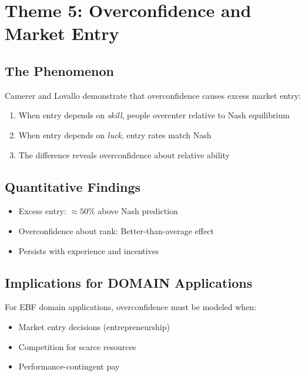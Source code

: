 \section{Theme 5: Overconfidence and Market Entry}
\label{sec:ca-overconfidence}

\subsection{The Phenomenon}

Camerer and Lovallo \citep{camerer1999overconfidence} demonstrate that overconfidence causes excess market entry:

\begin{enumerate}[nosep]
\item When entry depends on \textit{skill}, people overenter relative to Nash equilibrium
\item When entry depends on \textit{luck}, entry rates match Nash
\item The difference reveals overconfidence about relative ability
\end{enumerate}

\subsection{Quantitative Findings}

\begin{itemize}[nosep]
\item Excess entry: $\approx 50\%$ above Nash prediction
\item Overconfidence about rank: Better-than-average effect
\item Persists with experience and incentives
\end{itemize}

\subsection{Implications for DOMAIN Applications}

For EBF domain applications, overconfidence must be modeled when:
\begin{itemize}[nosep]
\item Market entry decisions (entrepreneurship)
\item Competition for scarce resources
\item Performance-contingent pay
\end{itemize}


